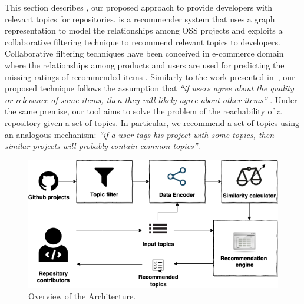 This section describes \TF, our proposed approach to provide developers with relevant topics for \GH repositories. 
\TF is a recommender system %
that uses a graph representation to model the relationships among OSS projects and exploits a collaborative filtering technique \cite{Schafer:2007:CFR:1768197.1768208} to recommend relevant \GH topics to developers. 
Collaborative filtering techniques have been conceived in e-commerce domain where the relationships among products and users are used for predicting the missing ratings of recommended items \cite{Linden:2003:ARI:642462.642471}. 
Similarly to the work presented in~\cite{NGUYEN2020110460}, our proposed technique follows the assumption that \emph{``if users agree about the quality or relevance of some items, then they will likely agree about other items''} \cite{Schafer:2007:CFR:1768197.1768208}. 
Under the same premise, our tool aims to solve the problem of the reachability of a \GH repository given a set of topics. In particular, we recommend a set of topics using an analogous mechanism: \emph{``if a user tags his project with some topics, then similar projects will probably contain common topics''}. 

\begin{figure}[t!]
	\centering
	\includegraphics[width=\linewidth]{figs/TopFilter.png}
	\caption{Overview of the \TF Architecture.}%
	\label{fig:CrossRecArchitecture}
\end{figure}


